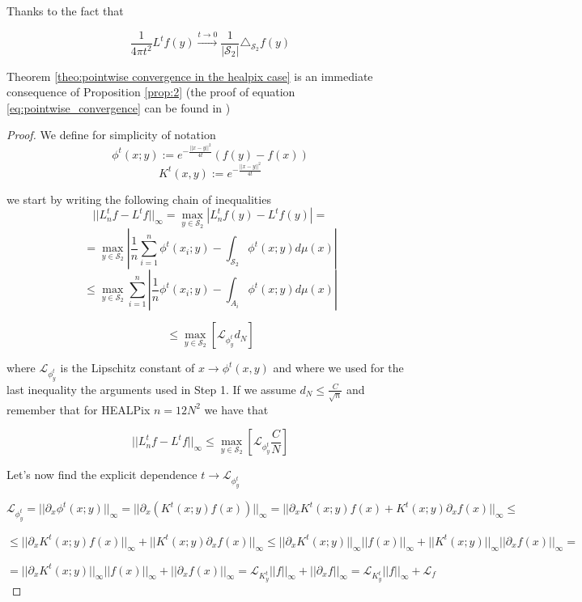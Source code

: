 Thanks to the fact that 

\begin{equation}
	\frac{1}{4\pi t^2} L^tf(y) \xrightarrow{t\to 0 } \frac{1}{|\mathcal S_2|}\triangle_{\mathcal S_2}f(y)
	\label{eq:pointwise_convergence}
\end{equation}

Theorem \ref{theo:pointwise convergence in the healpix case} is an immediate consequence of Proposition \ref{prop:2} (the proof of equation \ref{eq:pointwise_convergence} can be found in \cite{Belkin:2005:TTF:2138147.2138189})

\begin{proof}
	
	We define for simplicity of notation
	$$\phi^t(x;y) := e^{-\frac{||x-y||^2}{4t}}\left(f(y)-f(x)\right)$$
	$$K^t(x,y) :=  e^{-\frac{||x-y||^2}{4t}}$$

	
	we start by writing the following chain of inequalities
	$$||L_n^tf-L^tf||_\infty = \max _{y\in \mathcal S_2} \left|L_n^tf(y)-L^tf(y)\right|=$$
	$$= \max _{y\in \mathcal S_2} \left| \frac{1}{n} \sum_{i=1}^n \phi^t(x_i; y)- \int_{\mathcal S_2} \phi^t(x;y)d\mu(x) \right|$$
	$$\leq \max _{y\in \mathcal S_2}  \sum_{i=1}^n   \left| \frac{1}{n}  \phi^t(x_i; y)- \int_{A_i} \phi^t(x;y)d\mu(x) \right|$$

	$$\leq  \max _{y\in \mathcal S_2} \left[\mathcal L_{\phi^t_y}d_N \right]$$
	
	where $\mathcal L_{\phi^t_y}$ is the Lipschitz constant of $x \rightarrow \phi^t(x, y)$ and where we used for the last inequality the arguments used in Step 1. If we assume $d_N\leq \frac{C}{\sqrt{n}}$ and remember that for HEALPix $n=12N^2$ we have that
	
	$$||L_n^tf-L^tf||_\infty  \leq  \max _{y\in \mathcal S_2} \left[ \mathcal L_{\phi^t_y} \frac{C}{N} \right]$$
	
	Let's now find the explicit dependence $t\rightarrow \mathcal L_{\phi^t_y}$
	
	$\mathcal L_{\phi^t_y} = ||\partial_x\phi^t(x;y)||_\infty = ||\partial_x\left(K^t(x;y)f(x)\right)||_\infty = ||\partial_x K^t(x;y)f(x) + K^t(x;y)\partial_x f(x)||_\infty \leq$
	
	$ \leq ||\partial_x K^t(x;y)f(x)||_\infty + ||K^t(x;y)\partial_x f(x)||_\infty \leq  ||\partial_x K^t(x;y)||_\infty||f(x)||_\infty + ||K^t(x;y)||_\infty||\partial_x f(x)||_\infty = $
	
	$ = ||\partial_x K^t(x;y)||_\infty||f(x)||_\infty + ||\partial_x f(x)||_\infty = \mathcal L_{K^t_y} ||f||_\infty + ||\partial_xf||_\infty = \mathcal L_{K^t_y} ||f||_\infty + \mathcal L_f$
	

\end{proof}
